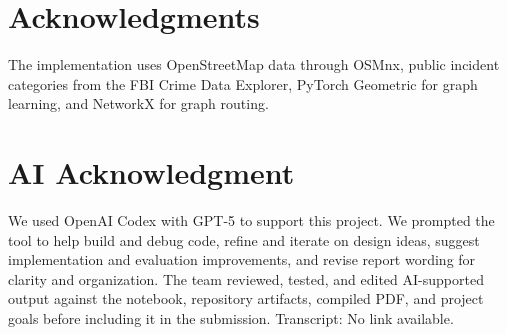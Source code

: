 \documentclass{article}
\begin{document}
\section*{Acknowledgments}

The implementation uses OpenStreetMap data through OSMnx, public incident categories from the FBI Crime Data Explorer, PyTorch Geometric for graph learning, and NetworkX for graph routing.

\section*{AI Acknowledgment}

We used OpenAI Codex with GPT-5 to support this project. We prompted the tool to help build and debug code, refine and iterate on design ideas, suggest implementation and evaluation improvements, and revise report wording for clarity and organization. The team reviewed, tested, and edited AI-supported output against the notebook, repository artifacts, compiled PDF, and project goals before including it in the submission. Transcript: No link available.



\end{document}
